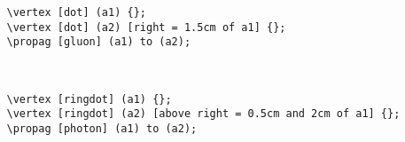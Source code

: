 \documentclass[10pt,letterpaper,twoside,notitlepage]{article}
\numberwithin{figure}{section}
\begin{document}
\noindent
\begin{minipage}{0.75\linewidth}
\blucol\begin{verbatim}
   \vertex [dot] (a1) {};
   \vertex [dot] (a2) [right = 1.5cm of a1] {};
   \propag [gluon] (a1) to (a2);
\end{verbatim}\txcol
\end{minipage}
%
\begin{minipage}{0.2\linewidth}
\end{minipage}
\\
\begin{minipage}{0.75\linewidth}
\blucol\begin{verbatim}
   \vertex [ringdot] (a1) {};
   \vertex [ringdot] (a2) [above right = 0.5cm and 2cm of a1] {};
   \propag [photon] (a1) to (a2);
\end{verbatim}\txcol
\end{minipage}
%
\begin{minipage}{0.2\linewidth}
\end{minipage}



%
%
\end{document}

